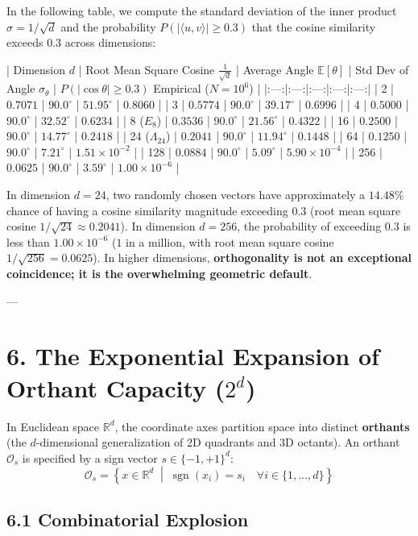 \documentclass[11pt,twoside,openright]{amsbook}
\begin{document}
In the following table, we compute the standard deviation of the inner product $\sigma = 1/\sqrt{d}$ and the probability $P(|\langle u, v \rangle| \ge 0.3)$ that the cosine similarity exceeds $0.3$ across dimensions:

| Dimension $d$ | Root Mean Square Cosine $\frac{1}{\sqrt{d}}$ | Average Angle $\mathbb{E}[\theta]$ | Std Dev of Angle $\sigma_\theta$ | $P(|\cos\theta| \ge 0.3)$ Empirical ($N=10^6$) |
|:---:|:---:|:---:|:---:|:---:|
| 2 | $0.7071$ | $90.0^\circ$ | $51.95^\circ$ | $0.8060$ |
| 3 | $0.5774$ | $90.0^\circ$ | $39.17^\circ$ | $0.6996$ |
| 4 | $0.5000$ | $90.0^\circ$ | $32.52^\circ$ | $0.6234$ |
| 8 ($E_8$) | $0.3536$ | $90.0^\circ$ | $21.56^\circ$ | $0.4322$ |
| 16 | $0.2500$ | $90.0^\circ$ | $14.77^\circ$ | $0.2418$ |
| 24 ($\Lambda_{24}$) | $0.2041$ | $90.0^\circ$ | $11.94^\circ$ | $0.1448$ |
| 64 | $0.1250$ | $90.0^\circ$ | $7.21^\circ$ | $1.51 \times 10^{-2}$ |
| 128 | $0.0884$ | $90.0^\circ$ | $5.09^\circ$ | $5.90 \times 10^{-4}$ |
| 256 | $0.0625$ | $90.0^\circ$ | $3.59^\circ$ | $1.00 \times 10^{-6}$ |

In dimension $d = 24$, two randomly chosen vectors have approximately a $14.48\%$ chance of having a cosine similarity magnitude exceeding $0.3$ (root mean square cosine $1/\sqrt{24} \approx 0.2041$). In dimension $d = 256$, the probability of exceeding $0.3$ is less than $1.00 \times 10^{-6}$ ($1$ in a million, with root mean square cosine $1/\sqrt{256} = 0.0625$). In higher dimensions, \textbf{orthogonality is not an exceptional coincidence; it is the overwhelming geometric default}.

---

\section{6. The Exponential Expansion of Orthant Capacity ($2^d$)}

In Euclidean space $\mathbb{R}^d$, the coordinate axes partition space into distinct \textbf{orthants} (the $d$-dimensional generalization of 2D quadrants and 3D octants).
An orthant $\mathcal{O}_s$ is specified by a sign vector $s \in \{-1, +1\}^d$:
$$\mathcal{O}_s = \left\{ x \in \mathbb{R}^d \;\middle|\; \operatorname{sgn}(x_i) = s_i \quad \forall i \in \{1, \dots, d\} \right\}$$

\subsection{6.1 Combinatorial Explosion}
\end{document}
